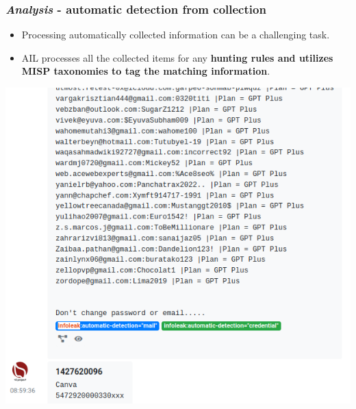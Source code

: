 \documentclass{beamer}
\begin{document}
\begin{frame}
   \frametitle{{\it Analysis} - automatic detection from collection}
   \begin{itemize}
     \item Processing automatically collected information can be a challenging task.
     \item AIL processes all the collected items for any {\bf hunting rules and utilizes MISP taxonomies to tag the matching information}.
   \end{itemize}
    \begin{center}
        \includegraphics[scale=0.2]{images/ail-detection.png}
    \end{center}
\end{frame}
\end{document}
